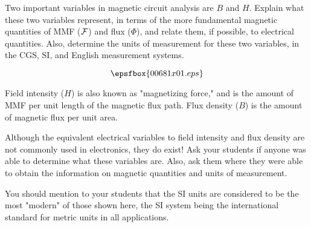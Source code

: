 

Two important variables in magnetic circuit analysis are $B$ and $H$.  Explain what these two variables represent, in terms of the more fundamental magnetic quantities of MMF (${\cal F}$) and flux ($\Phi$), and relate them, if possible, to electrical quantities.  Also, determine the units of measurement for these two variables, in the CGS, SI, and English measurement systems.







$$\epsfbox{00681x01.eps}$$

Field intensity ($H$) is also known as "magnetizing force," and is the amount of MMF per unit length of the magnetic flux path.  Flux density ($B$) is the amount of magnetic flux per unit area.







Although the equivalent electrical variables to field intensity and flux density are not commonly used in electronics, they do exist!  Ask your students if anyone was able to determine what these variables are.  Also, ask them where they were able to obtain the information on magnetic quantities and units of measurement.

You should mention to your students that the SI units are considered to be the most "modern" of those shown here, the SI system being the international standard for metric units in all applications.




